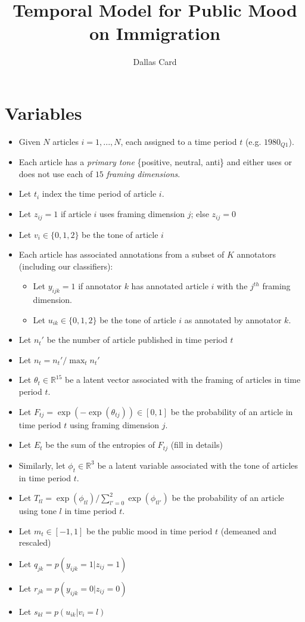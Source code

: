 \documentclass[11pt]{article}
\theoremstyle{plain}
\theoremstyle{definition}
\begin{document}
 

\title{Temporal Model for Public Mood on Immigration}
\author{Dallas Card}
\maketitle

\section{Variables}

\begin{itemize}
\item Given $N$ articles $i = 1, ..., N$, each assigned to a time period $t$ (e.g. $1980_{Q1}$).
\item Each article has a \textit{primary tone} \{positive, neutral, anti\} and either uses or does not use each of $15$ \textit{framing dimensions}.
\item Let $t_i$ index the time period of article $i$.
\item Let $z_{ij} = 1$ if article $i$ uses framing dimension $j$; else $z_{ij}=0$
\item Let $v_{i} \in \{0,1,2\}$ be the tone of article $i$
\item Each article has associated annotations from a subset of $K$ annotators (including our classifiers):\
\begin{itemize}
\item Let $y_{ijk} = 1$ if annotator $k$ has annotated article $i$ with the $j^{th}$ framing dimension.
\item Let $u_{ik} \in \{0, 1, 2\}$ be the tone of article $i$ as annotated by annotator $k$.
\end{itemize}
\item Let $n_t'$ be the number of article published in time period $t$
\item Let $n_t = n_t' / \max_t n_t'$
\item Let $\theta_t \in \mathbb{R}^15$ be a latent vector associated with the framing of articles in time period $t$.
\item Let $F_{tj} = \exp ( -\exp(\theta_{tj})) \in [0,1]$ be the probability of an article in time period $t$ using framing dimension $j$.
\item Let $E_t$ be the sum of the entropies of $F_{tj}$ (fill in details)
\item Similarly, let $\phi_t \in \mathbb{R}^3$ be a latent variable associated with the tone of articles in time period $t$.
\item Let $T_{tl} = \exp(\phi_{tl}) / \sum_{l' = 0}^2 \exp(\phi_{tl'})$ be the probability of an article using tone $l$ in time period $t$.
\item Let $m_t \in [-1,1] $ be the public mood in time period $t$ (demeaned and rescaled)
\item Let $q_{jk} = p(y_{ijk}=1|z_{ij} = 1) $
\item Let $r_{jk} = p(y_{ijk}=0|z_{ij} = 0)$
\item Let $s_{kl} = p(u_{ik} | v_i = l)$
\end{itemize} 
\end{document}
